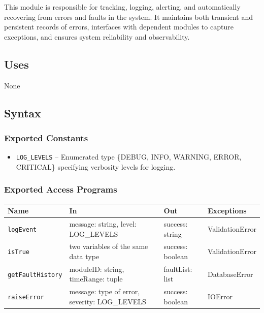 \documentclass[12pt, titlepage]{article}
\begin{document}
\par{This module is responsible for tracking, logging, alerting, and automatically recovering from errors and faults in the system. It maintains both transient and persistent records of errors, interfaces with dependent modules to capture exceptions, and ensures system reliability and observability.}

\subsection{Uses}

None


\subsection{Syntax}

\subsubsection{Exported Constants}
\begin{itemize}
    \item \texttt{LOG\_LEVELS} – Enumerated type \{DEBUG, INFO, WARNING, ERROR, CRITICAL\} specifying verbosity levels for logging.
\end{itemize}

\subsubsection{Exported Access Programs}

\begin{center}
\begin{tabularx}{\textwidth}{l X X l}
\hline
\textbf{Name} & \textbf{In} & \textbf{Out} & \textbf{Exceptions} \\
\hline
\texttt{logEvent} & message: string, level: LOG\_LEVELS & success: string & ValidationError \\
\hline
\texttt{isTrue} & two variables of the same data type & success: boolean & ValidationError \\
\hline
\texttt{getFaultHistory} & moduleID: string, timeRange: tuple & faultList: list & DatabaseError \\
\hline
\texttt{raiseError} & message: type of error, severity: LOG\_LEVELS & success: boolean & IOError \\
\hline
\end{tabularx}
\end{center}
\end{document}
